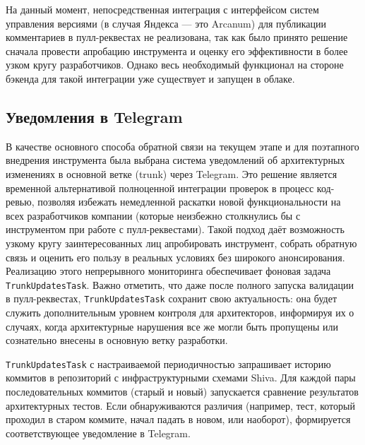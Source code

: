 На данный момент, непосредственная интеграция с интерфейсом систем управления версиями (в случая Яндекса — это Arcanum) для публикации комментариев в пулл-реквестах не реализована, так как было принято решение сначала провести апробацию инструмента и оценку его эффективности в более узком кругу разработчиков. Однако весь необходимый функционал на стороне бэкенда для такой интеграции уже существует и запущен в облаке.

\subsection{Уведомления в Telegram}

В качестве основного способа обратной связи на текущем этапе и для поэтапного внедрения инструмента была выбрана система уведомлений об архитектурных изменениях в основной ветке (trunk) через Telegram. Это решение является временной альтернативой полноценной интеграции проверок в процесс код-ревью, позволяя избежать немедленной раскатки новой функциональности на всех разработчиков компании (которые неизбежно столкнулись бы с инструментом при работе с пулл-реквестами). Такой подход даёт возможность узкому кругу заинтересованных лиц апробировать инструмент, собрать обратную связь и оценить его пользу в реальных условиях без широкого анонсирования. Реализацию этого непрерывного мониторинга обеспечивает фоновая задача \verb|TrunkUpdatesTask|. Важно отметить, что даже после полного запуска валидации в пулл-реквестах, \verb|TrunkUpdatesTask| сохранит свою актуальность: она будет служить дополнительным уровнем контроля для архитекторов, информируя их о случаях, когда архитектурные нарушения все же могли быть пропущены или сознательно внесены в основную ветку разработки.

\verb|TrunkUpdatesTask| с настраиваемой периодичностью запрашивает историю коммитов в репозиторий с инфраструктурными схемами Shiva. Для каждой пары последовательных коммитов (старый и новый) запускается сравнение результатов архитектурных тестов. Если обнаруживаются различия (например, тест, который проходил в старом коммите, начал падать в новом, или наоборот), формируется соответствующее уведомление в Telegram.

